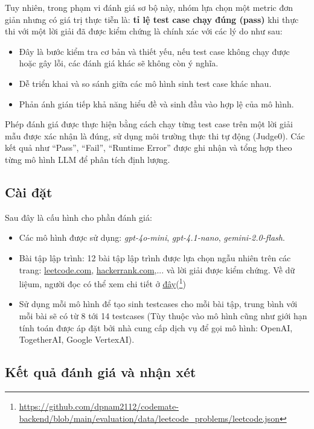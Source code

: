 Tuy nhiên, trong phạm vi đánh giá sơ bộ này, nhóm lựa chọn một metric đơn giản nhưng có giá trị thực tiễn là: \textbf{tỉ lệ test case chạy đúng (pass)} khi thực thi với một lời giải đã được kiểm chứng là chính xác với các lý do như sau:
\begin{itemize}
    \item Đây là bước kiểm tra cơ bản và thiết yếu, nếu test case không chạy được hoặc gây lỗi, các đánh giá khác sẽ không còn ý nghĩa.
    \item Dễ triển khai và so sánh giữa các mô hình sinh test case khác nhau.
    \item Phản ánh gián tiếp khả năng hiểu đề và sinh đầu vào hợp lệ của mô hình.
\end{itemize}

Phép đánh giá được thực hiện bằng cách chạy từng test case trên một lời giải mẫu được xác nhận là đúng, sử dụng môi trường thực thi tự động (Judge0). Các kết quả như “Pass”, “Fail”, “Runtime Error” được ghi nhận và tổng hợp theo từng mô hình LLM để phân tích định lượng.

\subsection{Cài đặt}
Sau đây là cấu hình cho phần đánh giá:
\begin{itemize}
    \item Các mô hình được sử dụng: \emph{gpt-4o-mini}, \emph{gpt-4.1-nano}, \emph{gemini-2.0-flash}.
    \item Bài tập lập trình: 12 bài tập lập trình được lựa chọn ngẫu nhiên trên các trang: \url{leetcode.com}, \url{hackerrank.com},... và lời giải được kiểm chứng. Về dữ liệum, người đọc có thể xem chi tiết ở \href{https://github.com/dpnam2112/codemate-backend/blob/main/evaluation/data/leetcode_problems/leetcode.json}{đây}(\footnote{\url{https://github.com/dpnam2112/codemate-backend/blob/main/evaluation/data/leetcode_problems/leetcode.json}})
    \item Sử dụng mỗi mô hình để tạo sinh testcases cho mỗi bài tập, trung bình với mỗi bài sẽ có từ 8 tới 14 testcases (Tùy thuộc vào mô hình cũng như giới hạn tính toán được áp đặt bởi nhà cung cấp dịch vụ để gọi mô hình: OpenAI, TogetherAI, Google VertexAI).

\end{itemize}

\subsection{Kết quả đánh giá và nhận xét}

